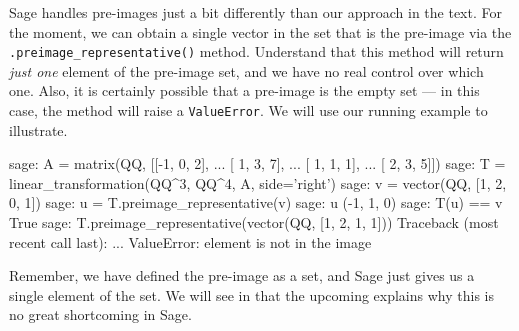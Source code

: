 Sage handles pre-images just a bit differently than our approach in the text.  For the moment, we can obtain a single vector in the set that is the pre-image via the \verb?.preimage_representative()? method.  Understand that this method will return \emph{just one} element of the pre-image set, and we have no real control over which one.  Also, it is certainly possible that a pre-image is the empty set --- in this case, the method will raise a \verb?ValueError?.  We will use our running example to illustrate.
%
\begin{sageexample}
sage: A = matrix(QQ, [[-1, 0, 2],
...                   [ 1, 3, 7],
...                   [ 1, 1, 1],
...                   [ 2, 3, 5]])
sage: T = linear_transformation(QQ^3, QQ^4, A, side='right')
sage: v = vector(QQ, [1, 2, 0, 1])
sage: u = T.preimage_representative(v)
sage: u
(-1, 1, 0)
sage: T(u) == v
True
sage: T.preimage_representative(vector(QQ, [1, 2, 1, 1]))
Traceback (most recent call last):
...
ValueError: element is not in the image
\end{sageexample}
%
Remember, we have defined the pre-image as a set, and Sage just gives us a single element of the set.  We will see in  that the upcoming  explains why this is no great shortcoming in Sage.
%
\begin{sageverbatim}
\end{sageverbatim}
%




